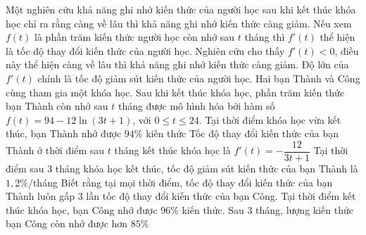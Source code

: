 \begin{ex}%
	Một nghiên cứu khả năng ghi nhớ kiến thức của người học sau khi kết thúc khóa học chỉ ra rằng càng về lâu thì khả năng ghi nhớ kiến thức càng giảm. Nếu xem $f(t)$ là phần trăm kiến thức người học còn nhớ sau $t$ tháng thì $f'(t)$ thể hiện là tốc độ thay đổi kiến thức của người học. Nghiên cứu cho thấy $f'(t)<0$, điều này thể hiện càng về lâu thì khả năng ghi nhớ kiến thức càng giảm. Độ lớn của $f'(t)$ chính là tốc độ giảm sút kiến thức của người học. Hai bạn Thành và Công cùng tham gia một khóa học. Sau khi kết thúc khóa học, phần trăm kiến thức bạn Thành còn nhớ sau $t$ tháng được mô hình hóa bởi hàm số $f(t)=94-12\ln(3t+1)$, với $0\le t\le 24$.
	\choiceTF
	{\True Tại thời điểm khóa học vừa kết thúc, bạn Thành nhớ được $94\%$ kiến thức}
	{Tốc độ thay đổi kiến thức của bạn Thành ở thời điểm sau $t$ tháng kết thúc khóa học là $f'(t)=-\dfrac{12}{3t+1}$}
	{Tại thời điểm sau $3$ tháng khóa học kết thúc, tốc độ giảm sút kiến thức của bạn Thành là $1{,}2\%$/tháng}
	{\True Biết rằng tại mọi thời điểm, tốc độ thay đổi kiến thức của bạn Thành luôn gấp $3$ lần tốc độ thay đổi kiến thức của bạn Công. Tại thời điểm kết thúc khóa học, bạn Công nhớ được $96\%$ kiến thức. Sau $3$ tháng, lượng kiến thức bạn Công còn nhớ được hơn $85\%$}
\end{ex}


